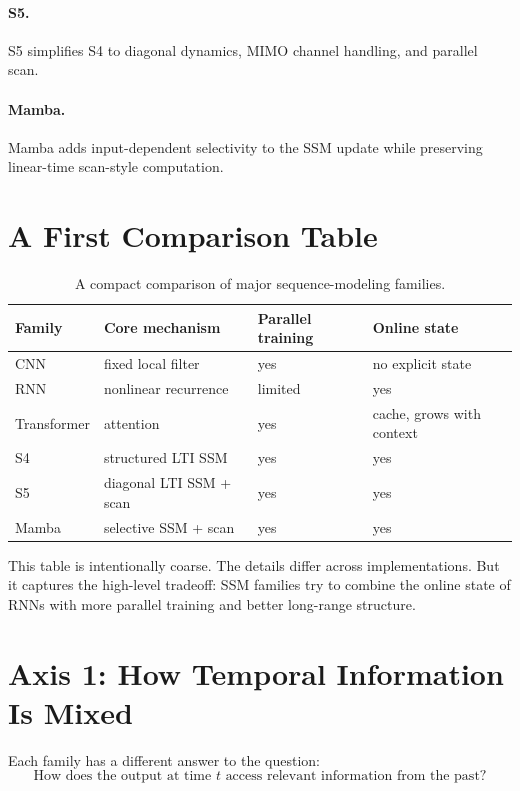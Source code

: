 \paragraph{S5.}
S5 simplifies S4 to diagonal dynamics, MIMO channel handling, and parallel scan.

\paragraph{Mamba.}
Mamba adds input-dependent selectivity to the SSM update while preserving linear-time
scan-style computation.

\section{A First Comparison Table}

\begin{table}[h]
\centering
\begin{tabular}{llll}
\toprule
Family & Core mechanism & Parallel training & Online state \\
\midrule
CNN & fixed local filter & yes & no explicit state \\
RNN & nonlinear recurrence & limited & yes \\
Transformer & attention & yes & cache, grows with context \\
S4 & structured LTI SSM & yes & yes \\
S5 & diagonal LTI SSM + scan & yes & yes \\
Mamba & selective SSM + scan & yes & yes \\
\bottomrule
\end{tabular}
\caption{A compact comparison of major sequence-modeling families.}
\label{tab:family-comparison}
\end{table}

This table is intentionally coarse. The details differ across implementations. But it
captures the high-level tradeoff: SSM families try to combine the online state of RNNs
with more parallel training and better long-range structure.

\section{Axis 1: How Temporal Information Is Mixed}

Each family has a different answer to the question:
\[
  \text{How does the output at time } t \text{ access relevant information from the past?}
\]

